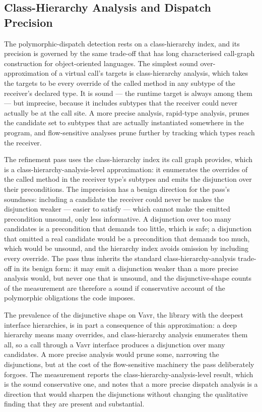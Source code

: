 \subsection{Class-Hierarchy Analysis and Dispatch Precision}

The polymorphic-dispatch detection rests on a class-hierarchy index, and its
precision is governed by the same trade-off that has long characterised
call-graph construction for object-oriented languages. The simplest sound
over-approximation of a virtual call's targets is class-hierarchy analysis, which
takes the targets to be every override of the called method in any subtype of the
receiver's declared type. It is sound --- the runtime target is always among them
--- but imprecise, because it includes subtypes that the receiver could never
actually be at the call site. A more precise analysis, rapid-type analysis,
prunes the candidate set to subtypes that are actually instantiated somewhere in
the program, and flow-sensitive analyses prune further by tracking which types
reach the receiver.

The refinement pass uses the class-hierarchy index its call graph provides, which
is a class-hierarchy-analysis-level approximation: it enumerates the overrides of
the called method in the receiver type's subtypes and emits the disjunction over
their preconditions. The imprecision has a benign direction for the pass's
soundness: including a candidate the receiver could never be makes the disjunction
weaker --- easier to satisfy --- which cannot make the emitted precondition unsound,
only less informative. A disjunction over too many candidates is a precondition
that demands too little, which is safe; a disjunction that omitted a real candidate
would be a precondition that demands too much, which would be unsound, and the
hierarchy index avoids omission by including every override. The pass thus inherits
the standard class-hierarchy-analysis trade-off in its benign form: it may emit a
disjunction weaker than a more precise analysis would, but never one that is
unsound, and the disjunctive-shape counts of the measurement are therefore a sound
if conservative account of the polymorphic obligations the code imposes.

The prevalence of the disjunctive shape on Vavr, the library with the deepest
interface hierarchies, is in part a consequence of this approximation: a deep
hierarchy means many overrides, and class-hierarchy analysis enumerates them all,
so a call through a Vavr interface produces a disjunction over many candidates. A
more precise analysis would prune some, narrowing the disjunctions, but at the cost
of the flow-sensitive machinery the pass deliberately forgoes. The measurement
reports the class-hierarchy-analysis-level result, which is the sound conservative
one, and notes that a more precise dispatch analysis is a direction that would
sharpen the disjunctions without changing the qualitative finding that they are
present and substantial.

